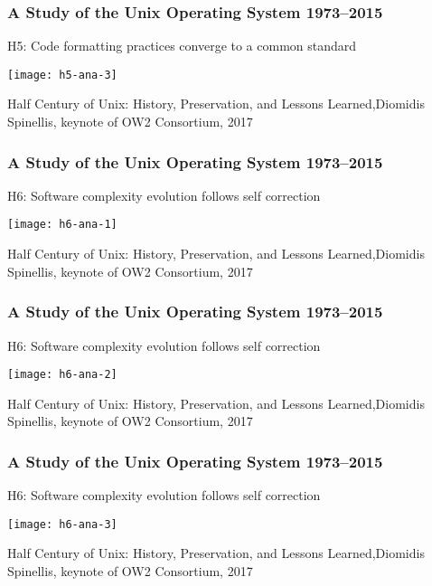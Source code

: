 \begin{frame}[plain]
	\frametitle{A Study of the Unix Operating System 1973–2015}
	\centering
	H5: Code formatting practices
	converge to a common standard
	
	
	\texttt{[image: h5-ana-3]}
	
	\tiny Half Century of Unix:
	History, Preservation, and
	Lessons Learned,Diomidis Spinellis, keynote of OW2 Consortium, 2017
	
\end{frame}	




\begin{frame}[plain]
	\frametitle{A Study of the Unix Operating System 1973–2015}
	\centering
	H6: Software complexity evolution
	follows self correction

	\texttt{[image: h6-ana-1]}
	
	\tiny Half Century of Unix:
	History, Preservation, and
	Lessons Learned,Diomidis Spinellis, keynote of OW2 Consortium, 2017
	
\end{frame}	

\begin{frame}[plain]
	\frametitle{A Study of the Unix Operating System 1973–2015}
	\centering
	H6: Software complexity evolution
	follows self correction
	
	\texttt{[image: h6-ana-2]}
	
	\tiny Half Century of Unix:
	History, Preservation, and
	Lessons Learned,Diomidis Spinellis, keynote of OW2 Consortium, 2017
	
\end{frame}	


\begin{frame}[plain]
	\frametitle{A Study of the Unix Operating System 1973–2015}
	\centering
	H6: Software complexity evolution
	follows self correction
	
	\texttt{[image: h6-ana-3]}
	
	\tiny Half Century of Unix:
	History, Preservation, and
	Lessons Learned,Diomidis Spinellis, keynote of OW2 Consortium, 2017
	
\end{frame}	




